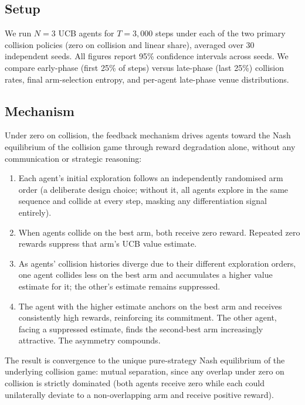\documentclass[11pt]{article}
\begin{document}
\subsection{Setup}

We run $N = 3$ UCB agents for $T = 3{,}000$ steps under each of the two
primary collision policies (zero on collision and linear share), averaged
over 30 independent seeds.
All figures report 95\% confidence intervals across seeds.
We compare early-phase (first 25\% of steps) versus late-phase (last 25\%)
collision rates, final arm-selection entropy, and per-agent late-phase
venue distributions.

\subsection{Mechanism}

Under zero on collision, the feedback mechanism drives agents toward the
Nash equilibrium of the collision game through reward degradation alone,
without any communication or strategic reasoning:
\begin{enumerate}
\item Each agent's initial exploration follows an independently randomised
  arm order (a deliberate design choice; without it, all agents explore
  in the same sequence and collide at every step, masking any
  differentiation signal entirely).
\item When agents collide on the best arm, both receive zero reward.
  Repeated zero rewards suppress that arm's UCB value estimate.
\item As agents' collision histories diverge due to their different
  exploration orders, one agent collides less on the best arm and
  accumulates a higher value estimate for it; the other's estimate
  remains suppressed.
\item The agent with the higher estimate anchors on the best arm and
  receives consistently high rewards, reinforcing its commitment.
  The other agent, facing a suppressed estimate, finds the second-best
  arm increasingly attractive. The asymmetry compounds.
\end{enumerate}

The result is convergence to the unique pure-strategy Nash equilibrium
of the underlying collision game: mutual separation, since any overlap
under zero on collision is strictly dominated (both agents receive zero
while each could unilaterally deviate to a non-overlapping arm and
receive positive reward).
\end{document}
